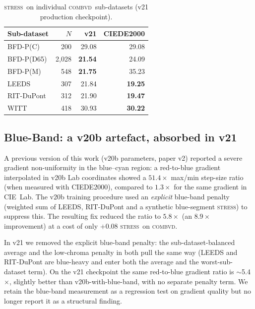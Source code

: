 \documentclass[11pt, twocolumn]{article}
\newcommand{\stress}{\textsc{stress}}
\newcommand{\combvd}{\textsc{combvd}}
\begin{document}
\begin{table}[t]
  \centering
  \small
  \setlength{\tabcolsep}{4pt}
  \caption{\stress\ on individual \combvd\ sub-datasets (v21 production checkpoint).}
  \label{tab:subdataset}
  \begin{tabular}{@{}lrrr@{}}
    \toprule
    Sub-dataset & $N$ & v21 & CIEDE2000 \\
    \midrule
    BFD-P(C)    & 200     & 29.08          & 29.08          \\
    BFD-P(D65)  & 2{,}028 & \textbf{21.54} & 24.09          \\
    BFD-P(M)    & 548     & \textbf{21.75} & 35.23          \\
    LEEDS       & 307     & 21.84          & \textbf{19.25} \\
    RIT-DuPont  & 312     & 21.90          & \textbf{19.47} \\
    WITT        & 418     & 30.93          & \textbf{30.22} \\
    \bottomrule
  \end{tabular}
\end{table}

\subsection{Blue-Band: a v20b artefact, absorbed in v21}
\label{sec:blue-band}

A previous version of this work (v20b parameters, paper v2) reported
a severe gradient non-uniformity in the blue--cyan region: a
red-to-blue gradient interpolated in v20b Lab coordinates showed a
$51.4\times$ max/min step-size ratio (when measured with CIEDE2000),
compared to $1.3\times$ for the same gradient in CIE~Lab.
The v20b training procedure used an \emph{explicit} blue-band penalty
(weighted sum of LEEDS, RIT-DuPont and a synthetic blue-segment
\stress) to suppress this. The resulting fix reduced the ratio to
$5.8\times$ (an $8.9\times$ improvement) at a cost of only
$+0.08$ \stress\ on \combvd.

In v21 we removed the explicit blue-band penalty: the
sub-dataset-balanced average and the low-chroma penalty in
 both pull the same way (LEEDS and RIT-DuPont are blue-heavy
and enter both the average and the worst-sub-dataset term). On the
v21 checkpoint the same red-to-blue gradient ratio is $\sim$5.4$\times$,
slightly better than v20b-with-blue-band, with no separate penalty
term. We retain the blue-band measurement as a regression test on
gradient quality but no longer report it as a structural finding.
\end{document}
